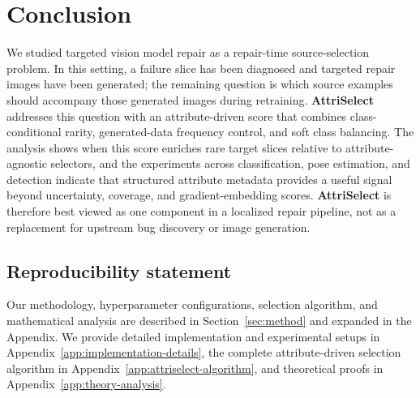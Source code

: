 \documentclass{article}
\newcommand{\modelname}{AttriSelect}
\newcommand{\model}{\textcolor{darkteal}{\textbf{\modelname}}\xspace}
\begin{document}

\section{Conclusion}

We studied targeted vision model repair as a repair-time source-selection problem. In this setting, a failure slice has been diagnosed and targeted repair images have been generated; the remaining question is which source examples should accompany those generated images during retraining. \model addresses this question with an attribute-driven score that combines class-conditional rarity, generated-data frequency control, and soft class balancing. The analysis shows when this score enriches rare target slices relative to attribute-agnostic selectors, and the experiments across classification, pose estimation, and detection indicate that structured attribute metadata provides a useful signal beyond uncertainty, coverage, and gradient-embedding scores. \model is therefore best viewed as one component in a localized repair pipeline, not as a replacement for upstream bug discovery or image generation.

\subsection*{Reproducibility statement}
Our methodology, hyperparameter configurations, selection algorithm, and mathematical analysis are described in Section~\ref{sec:method} and expanded in the Appendix. We provide detailed implementation and experimental setups in Appendix~\ref{app:implementation-details}, the complete attribute-driven selection algorithm in Appendix~\ref{app:attriselect-algorithm}, and theoretical proofs in Appendix~\ref{app:theory-analysis}.
\end{document}
